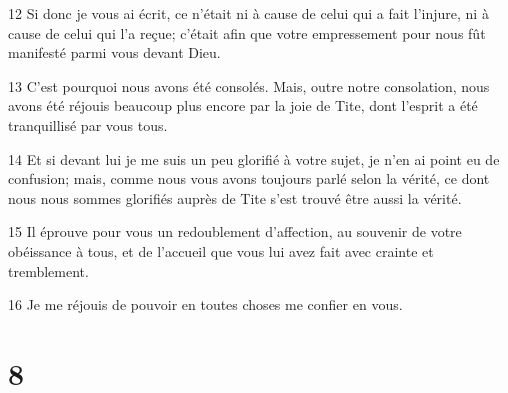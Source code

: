 \par 12 Si donc je vous ai écrit, ce n'était ni à cause de celui qui a fait l'injure, ni à cause de celui qui l'a reçue; c'était afin que votre empressement pour nous fût manifesté parmi vous devant Dieu.
\par 13 C'est pourquoi nous avons été consolés. Mais, outre notre consolation, nous avons été réjouis beaucoup plus encore par la joie de Tite, dont l'esprit a été tranquillisé par vous tous.
\par 14 Et si devant lui je me suis un peu glorifié à votre sujet, je n'en ai point eu de confusion; mais, comme nous vous avons toujours parlé selon la vérité, ce dont nous nous sommes glorifiés auprès de Tite s'est trouvé être aussi la vérité.
\par 15 Il éprouve pour vous un redoublement d'affection, au souvenir de votre obéissance à tous, et de l'accueil que vous lui avez fait avec crainte et tremblement.
\par 16 Je me réjouis de pouvoir en toutes choses me confier en vous.

\chapter{8}

